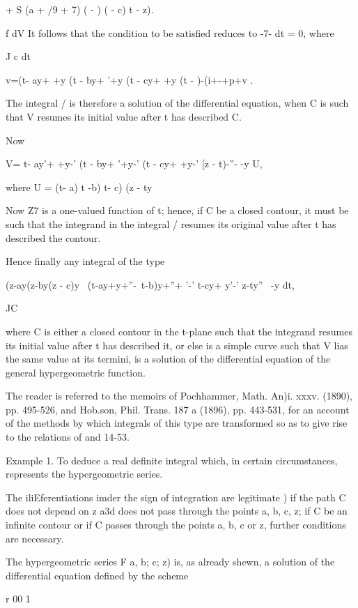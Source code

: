 + S (a + /9 + 7) ( - ) ( - c) t - z).

f dV It follows that the condition to be satisfied reduces to -7- dt =
0, where

J c dt

v=(t- ay+ +y (t - by+ '+y (t - cy+ +y (t - )-(i+-+p+v .

The integral / is therefore a solution of the differential equation,
when C is such that V resumes its initial value after t has described
C.

Now

V= t- ay'+ +y-' (t - by+ '+y-' (t - cy+ +y-' [z - t)-''- -y U,

where U = (t- a) t -b) t- c) (z - ty\

Now Z7 is a one-valued function of t; hence, if C be a closed
contour, it must be such that the integrand in the integral / resumes
its original value after t has described the contour.

Hence finally any integral of the type

(z-ay(z-by(z - c)y \ (t-ay+y+''-\ t-b)y+''+ '-' t-cy+ y'-' z-ty''~ -y
dt,

JC

where C is either a closed contour in the t-plane such that the
integrand resumes its initial value after t has described it, or else
is a simple curve such that V lias the same value at its termini, is a
solution of the differential equation of the general hypergeometric
function.

The reader is referred to the memoirs of Pochhammer, Math. An)i. xxxv.
(1890), pp. 495-526, and Hob.son, Phil. Trans. 187 a (1896), pp.
443-531, for an account of the methods by which integrals of this type
are transformed so as to give rise to the relations of and
14-53.

Example 1. To deduce a real definite integral which, in certain
circumstances, represents the hypergeometric series.

 The iliEferentiations imder the sign of integration are legitimate
) if the path C does not depend on z a3d does not pass through
the points a, b, c, z; if C be an infinite contour or if C passes
through the points a, b, c or z, further conditions are necessary.

%
%

The hypergeometric series F a, b; c; z) is, as already shewn, a
solution of the differential equation defined by the scheme

r 00 1 \

